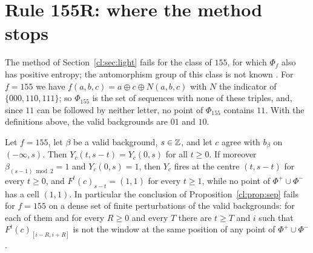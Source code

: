 \section{Rule 155R: where the method stops}\label{cl:sec:155}

The method of Section~\ref{cl:sec:light} fails for the class of $155$, for which $\Phi_f$ also has positive entropy; the automorphism group of this class is not known \cite{PaperD}. For $f=155$ we have $f(a,b,c)=a\oplus c\oplus N(a,b,c)$ with $N$ the indicator of $\{000,110,111\}$; so $\Phi_{155}$ is the set of sequences with none of these triples, and, since $11$ can be followed by neither letter, no point of $\Phi_{155}$ contains $11$. With the definitions above, the valid backgrounds are $01$ and $10$.

\begin{proposition}\label{cl:prop:155}
Let $f=155$, let $\beta$ be a valid background, $s\in\mathbb{Z}$, and let $c$ agree with $b_\beta$ on $(-\infty,s)$. Then $Y_c(t,s-t)=Y_c(0,s)$ for all $t\ge0$. If moreover $\beta_{(s-1)\bmod2}=1$ and $Y_c(0,s)=1$, then $Y_c$ fires at the centre $(t,s-t)$ for every $t\ge0$, and $F^t(c)_{s-t}=(1,1)$ for every $t\ge1$, while no point of $\Phi^+\cup\Phi^-$ has a cell $(1,1)$. In particular the conclusion of Proposition~\ref{cl:prop:sep} fails for $f=155$ on a dense set of finite perturbations of the valid backgrounds: for each of them and for every $R\ge0$ and every $T$ there are $t\ge T$ and $i$ such that $F^t(c)_{[i-R,i+R]}$ is not the window at the same position of any point of $\Phi^+\cup\Phi^-$.
\end{proposition}

